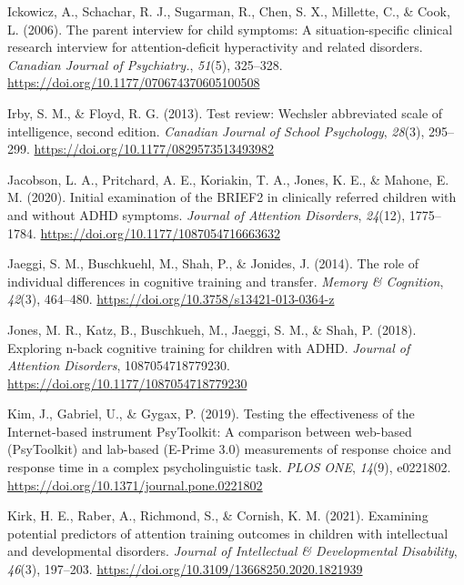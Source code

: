 \documentclass[
  letterpaper,
]{ut-thesis}
\newlength{\cslhangindent}
\newenvironment{CSLReferences}[2] %
 {\begin{list}{}{%
  \setlength{\itemindent}{0pt}
  \setlength{\leftmargin}{0pt}
  \setlength{\parsep}{0pt}
  \ifodd #1
   \setlength{\leftmargin}{\cslhangindent}
   \setlength{\itemindent}{-1\cslhangindent}
  \fi
  \setlength{\itemsep}{#2\baselineskip}}}
 {\end{list}}
\begin{document}
\begin{CSLReferences}{1}{0}
Ickowicz, A., Schachar, R. J., Sugarman, R., Chen, S. X., Millette, C.,
\& Cook, L. (2006). The parent interview for child symptoms: A
situation-specific clinical research interview for attention-deficit
hyperactivity and related disorders. \emph{Canadian Journal of
Psychiatry.}, \emph{51}(5), 325--328.
\url{https://doi.org/10.1177/070674370605100508}

Irby, S. M., \& Floyd, R. G. (2013). Test review: {Wechsler} abbreviated
scale of intelligence, second edition. \emph{Canadian Journal of School
Psychology}, \emph{28}(3), 295--299.
\url{https://doi.org/10.1177/0829573513493982}

Jacobson, L. A., Pritchard, A. E., Koriakin, T. A., Jones, K. E., \&
Mahone, E. M. (2020). Initial examination of the {BRIEF2} in clinically
referred children with and without {ADHD} symptoms. \emph{Journal of
Attention Disorders}, \emph{24}(12), 1775--1784.
\url{https://doi.org/10.1177/1087054716663632}

Jaeggi, S. M., Buschkuehl, M., Shah, P., \& Jonides, J. (2014). The role
of individual differences in cognitive training and transfer.
\emph{Memory \& Cognition}, \emph{42}(3), 464--480.
\url{https://doi.org/10.3758/s13421-013-0364-z}

Jones, M. R., Katz, B., Buschkueh, M., Jaeggi, S. M., \& Shah, P.
(2018). Exploring n-back cognitive training for children with {ADHD}.
\emph{Journal of Attention Disorders}, 1087054718779230.
\url{https://doi.org/10.1177/1087054718779230}

Kim, J., Gabriel, U., \& Gygax, P. (2019). Testing the effectiveness of
the {Internet-based} instrument {PsyToolkit}: {A} comparison between
web-based ({PsyToolkit}) and lab-based ({E-Prime} 3.0) measurements of
response choice and response time in a complex psycholinguistic task.
\emph{PLOS ONE}, \emph{14}(9), e0221802.
\url{https://doi.org/10.1371/journal.pone.0221802}

Kirk, H. E., Raber, A., Richmond, S., \& Cornish, K. M. (2021).
Examining potential predictors of attention training outcomes in
children with intellectual and developmental disorders. \emph{Journal of
Intellectual \& Developmental Disability}, \emph{46}(3), 197--203.
\url{https://doi.org/10.3109/13668250.2020.1821939}


\end{CSLReferences}
\end{document}
